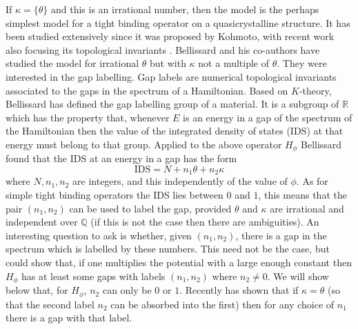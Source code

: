 \documentclass[11pt]{amsart}
\newcommand{\R}{\mathbb{R}}
\newcommand{\Q}{\mathbb{Q}}
\newcommand{\cut}{\kappa}
\begin{document}
If $\cut=\{\theta\}$ and this is an irrational number, then the model is the perhaps simplest model for a tight binding operator on a quasicrystalline structure. It has been studied extensively since it was proposed by Kohmoto, with recent work also focusing its topological invariants \cite{kraus2012topological,verbin2015topological,dana2014topologically,baboux2017measuring,jagannathan2025missing,kellendonk_prodan}. Bellissard and his co-authors have studied the model for irrational $\theta$ but with $\cut$ not a multiple of $\theta$. They were interested in the gap labelling. Gap labels are numerical topological invariants associated to the gaps in the spectrum of a Hamiltonian. Based on $K$-theory, Bellissard has defined the gap labelling group of a material. It is a subgroup of $\R$ which has the property that, whenever $E$ is an energy in a gap of the spectrum of the Hamiltonian
then the value of the integrated density of states (IDS) at that energy must belong to that group. Applied to the above operator $H_\phi$ Bellissard  \cite{bellissard1992gap} found that the IDS at an energy in a gap has the form 
\begin{equation}\label{eq-IDS-cut}
	\mathrm{IDS} = N + n_1\theta +n_2\cut
\end{equation}
where $N,n_1,n_2$ are integers, and this independently of the value of $\phi$. As for simple tight binding operators the IDS lies between $0$ and $1$, this means that the pair $(n_1,n_2)$ can be used to label the gap, provided $\theta$ and $\kappa$ are irrational and independent over $\Q$ (if this is not the case then there are ambiguities). An interesting question to ask is whether, given $(n_1,n_2)$, there is a gap in the spectrum which is labelled by these numbers. This need not be the case, but \cite{Bellissard_Iochum_Scoppola_Testard} could show that, if one multiplies the potential with a large enough constant then $H_\phi$ has at least some gaps with labels $(n_1,n_2)$ where $n_2\neq 0$. We will show below that, for $H_\phi$, $n_2$ can only be $0$ or $1$.
Recently \cite{band2024drymartiniproblemsturmian} has shown that if $\cut=\theta$ (so that the second label $n_2$ can be absorbed into the first) then for any choice of $n_1$ there is a gap with that label.
\end{document}

